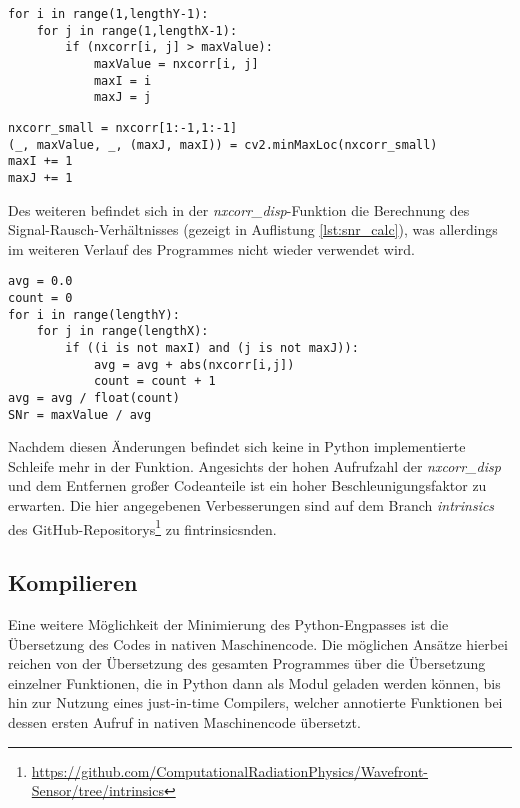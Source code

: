 \begin{lstlisting}[caption={Finden des Maximums einer Matrix}, label={lst:max2}]
for i in range(1,lengthY-1):
	for j in range(1,lengthX-1):
		if (nxcorr[i, j] > maxValue):
			maxValue = nxcorr[i, j]
			maxI = i
			maxJ = j
\end{lstlisting}

\begin{lstlisting}[caption={Finden des Maximums einer Matrix mittels NumPy und OpenCV}, label={lst:max2_fast}]
nxcorr_small = nxcorr[1:-1,1:-1]
(_, maxValue, _, (maxJ, maxI)) = cv2.minMaxLoc(nxcorr_small)
maxI += 1
maxJ += 1
\end{lstlisting}

Des weiteren befindet sich in der \textit{nxcorr\_disp}-Funktion die Berechnung des Signal-Rausch-Verhältnisses (gezeigt in Auflistung \ref{lst:snr_calc}), was allerdings im weiteren Verlauf des Programmes nicht wieder verwendet wird. 

\begin{lstlisting}[caption={Berechnung des Signal-Rausch-Verhältnisses}, label={lst:snr_calc}]
avg = 0.0
count = 0
for i in range(lengthY):
	for j in range(lengthX):
		if ((i is not maxI) and (j is not maxJ)):
			avg = avg + abs(nxcorr[i,j])
			count = count + 1
avg = avg / float(count)
SNr = maxValue / avg
\end{lstlisting}

Nachdem diesen Änderungen befindet sich keine in Python implementierte Schleife mehr in der Funktion. Angesichts der hohen Aufrufzahl der \textit{nxcorr\_disp} und dem Entfernen großer Codeanteile ist ein hoher Beschleunigungsfaktor zu erwarten. Die hier angegebenen Verbesserungen sind auf dem Branch \textit{intrinsics} des GitHub-Repositorys\footnote{\url{https://github.com/ComputationalRadiationPhysics/Wavefront-Sensor/tree/intrinsics}} zu fintrinsicsnden. 

\subsection{Kompilieren}

Eine weitere Möglichkeit der Minimierung des Python-Engpasses ist die Übersetzung des Codes in nativen Maschinencode. Die möglichen Ansätze hierbei reichen von der Übersetzung des gesamten Programmes über die Übersetzung einzelner Funktionen, die in Python dann als Modul geladen werden können, bis hin zur Nutzung eines just-in-time Compilers, welcher annotierte Funktionen bei dessen ersten Aufruf in nativen Maschinencode übersetzt. 


